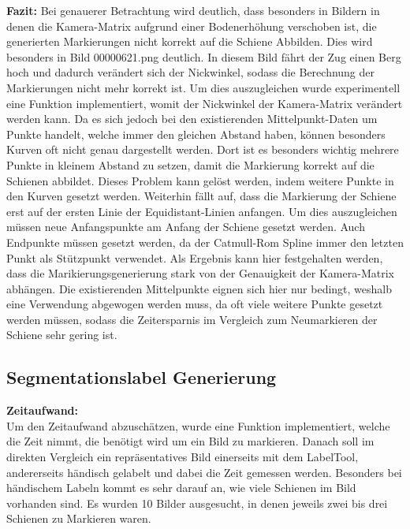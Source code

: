 \noindent
\textbf{Fazit:}
\noindent
Bei genauerer Betrachtung wird deutlich, dass besonders in Bildern in denen die Kamera-Matrix aufgrund einer Bodenerhöhung verschoben ist, die generierten Markierungen nicht korrekt auf die Schiene Abbilden. Dies wird besonders in Bild 00000621.png deutlich. In diesem Bild fährt der Zug einen Berg hoch und dadurch verändert sich der Nickwinkel, sodass die Berechnung der Markierungen nicht mehr korrekt ist. Um dies auszugleichen wurde experimentell eine Funktion implementiert, womit der Nickwinkel der Kamera-Matrix verändert werden kann. Da es sich jedoch bei den existierenden Mittelpunkt-Daten um Punkte handelt, welche immer den gleichen Abstand haben, können besonders Kurven oft nicht genau dargestellt werden. Dort ist es besonders wichtig mehrere Punkte in kleinem Abstand zu setzen, damit die Markierung korrekt auf die Schienen abbildet. Dieses Problem kann gelöst werden, indem weitere Punkte in den Kurven gesetzt werden. Weiterhin fällt auf, dass die Markierung der Schiene erst auf der ersten Linie der Equidistant-Linien anfangen. Um dies auszugleichen müssen neue Anfangspunkte am Anfang der Schiene gesetzt werden. Auch Endpunkte müssen gesetzt werden, da der Catmull-Rom Spline immer den letzten Punkt als Stützpunkt verwendet. Als Ergebnis kann hier festgehalten werden, dass die Marikierungsgenerierung stark von der Genauigkeit der Kamera-Matrix abhängen. Die existierenden Mittelpunkte eignen sich hier nur bedingt, weshalb eine Verwendung abgewogen werden muss, da oft viele weitere Punkte gesetzt werden müssen, sodass die Zeitersparnis im Vergleich zum Neumarkieren der Schiene sehr gering ist.

\subsection{Segmentationslabel Generierung}
\label{sec:Segmentationslabel Generierung}


\textbf{Zeitaufwand:}
\\

\noindent
Um den Zeitaufwand abzuschätzen, wurde eine Funktion implementiert, welche die Zeit nimmt, die benötigt wird um ein Bild zu markieren. Danach soll im direkten Vergleich ein repräsentatives Bild einerseits mit dem LabelTool, andererseits händisch gelabelt und dabei die Zeit gemessen werden. Besonders bei händischem Labeln kommt es sehr darauf an, wie viele Schienen im Bild vorhanden sind. Es wurden 10 Bilder ausgesucht, in denen jeweils zwei bis drei Schienen zu Markieren waren. 
\\

